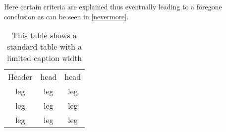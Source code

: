 Here certain criteria are explained thus eventually
leading to a foregone conclusion as can be seen in
\autoref{nevermore}.
\begin{table}[h!tb] \centering
    \captionsetup{width=2in}
    \caption{This table shows a standard table with a limited caption width}

    \begin{tabular}{c|c|c}
        Header & head & head \\
        leg    & leg  & leg  \\
        leg    & leg  & leg  \\
        leg    & leg  & leg  \\
    \end{tabular}
    \label{nevermore}
    \vspace{ 2 in}
\end{table}

